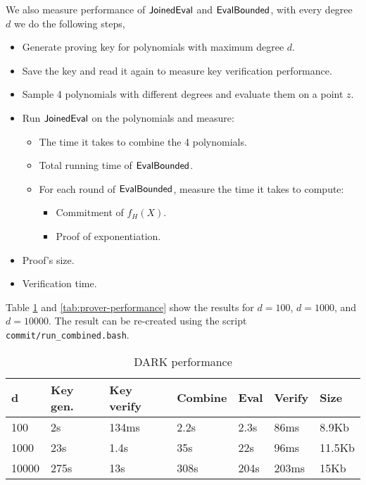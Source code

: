 We also measure performance of $\mathsf{JoinedEval}$ and $\mathsf{EvalBounded}$, with every degree $d$ we do the following steps,
\begin{itemize}
    \item Generate proving key for polynomials with maximum degree $d$.
    \item Save the key and read it again to measure key verification performance.
    \item Sample 4 polynomials with different degrees and evaluate them on a point $z$.
    \item Run $\mathsf{JoinedEval}$ on the polynomials and measure:
    \begin{itemize}
        \item The time it takes to combine the 4 polynomials.
        \item Total running time of $\mathsf{EvalBounded}$.
        \item For each round of $\mathsf{EvalBounded}$, measure the time it takes to compute:
        \begin{itemize}
            \item Commitment of $f_H(X)$.
            \item Proof of exponentiation.
        \end{itemize}
    \end{itemize}
    \item Proof's size.
    \item Verification time.
\end{itemize}

Table \ref{tab:dark-performance} and \ref{tab:prover-performance} show the results for $d=100$, $d=1000$, and $d=10000$. The result can be re-created using the script \texttt{commit/run\_combined.bash}.

\begin{table}[!htp]
\centering
\begin{tabular}{|l|l|l|l|l|l|l|}
\hline
d     & Key gen. & Key verify & Combine & Eval & Verify & Size   \\ \hline
100   & 2s       & 134ms      & 2.2s    & 2.3s & 86ms   & 8.9Kb  \\ \hline
1000  & 23s      & 1.4s       & 35s     & 22s  & 96ms   & 11.5Kb \\ \hline
10000 & 275s     & 13s        & 308s    & 204s & 203ms  & 15Kb   \\ \hline
\end{tabular}
\caption{DARK performance}
\label{tab:dark-performance}
\end{table}

